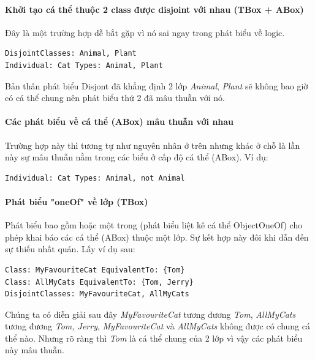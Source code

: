 \paragraph{Khởi tạo cá thể thuộc 2 class được disjoint với nhau (TBox + ABox)} Đây là một trường hợp dễ bắt gặp vì nó sai ngay trong phát biểu về logic.
\begin{verbatim}
DisjointClasses: Animal, Plant
Individual: Cat Types: Animal, Plant
\end{verbatim}
Bản thân phát biểu Disjont đã khẳng định 2 lớp \textit{Animal}, \textit{Plant} sẽ không bao giờ có cá thể chung nên phát biểu thứ 2 đã mâu thuẫn với nó.

\paragraph{Các phát biểu về cá thể (ABox) mâu thuẫn với nhau} Trường hợp này thì tương tự như nguyên nhân ở trên nhưng khác ở chỗ là lần này sự mâu thuẫn nằm trong các biểu ở cấp độ cá thể (ABox). Ví dụ:	
\begin{verbatim}
Individual: Cat Types: Animal, not Animal
\end{verbatim}

\paragraph{Phát biểu "oneOf" về lớp (TBox)} Phát biểu bao gồm hoặc một trong (phát biểu liệt kê cá thể ObjectOneOf) cho phép khai báo các cá thể (ABox) thuộc một lớp. Sự kết hợp này đôi khi dẫn đến sự thiếu nhất quán. Lấy ví dụ sau:
\begin{verbatim}
Class: MyFavouriteCat EquivalentTo: {Tom}
Class: AllMyCats EquivalentTo: {Tom, Jerry}
DisjointClasses: MyFavouriteCat, AllMyCats
\end{verbatim}
Chúng ta có diễn giải sau đây \textit{MyFavouriteCat} tương đương \textit{{Tom}}, \textit{AllMyCats} tương đương \textit{{Tom, Jerry}}, \textit{MyFavouriteCat} và \textit{AllMyCats} không được có chung cá thể nào. Nhưng rõ ràng thì \textit{Tom} là cá thể chung của 2 lớp vì vậy các phát biểu này mâu thuẫn.

